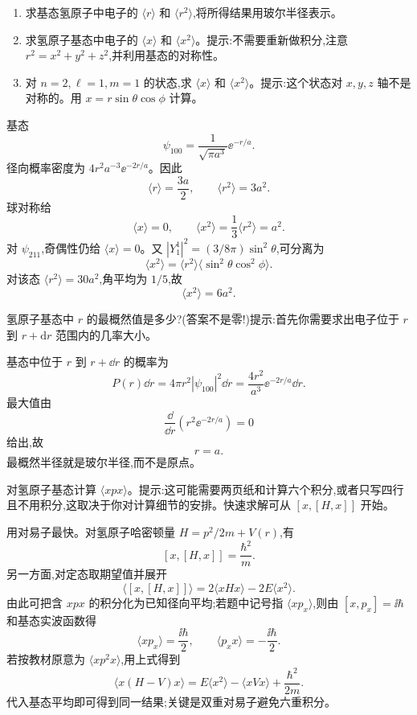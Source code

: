 \begin{question}
\begin{enumerate}
\item 求基态氢原子中电子的 $\langle r\rangle$ 和 $\langle r^2\rangle$,将所得结果用玻尔半径表示。
\item 求氢原子基态中电子的 $\langle x\rangle$ 和 $\langle x^2\rangle$。提示:不需要重新做积分,注意 $r^2=x^2+y^2+z^2$,并利用基态的对称性。
\item 对 $n=2,\ell=1,m=1$ 的状态,求 $\langle x\rangle$ 和 $\langle x^2\rangle$。提示:这个状态对 $x,y,z$ 轴不是对称的。用 $x=r\sin\theta\cos\phi$ 计算。
\end{enumerate}
\begin{solution}

基态
\[
\psi_{100}=\frac{1}{\sqrt{\pi a^3}}\ee^{-r/a}.
\]
径向概率密度为 $4r^2a^{-3}\ee^{-2r/a}$。因此
\[
\langle r\rangle=\frac{3a}{2},\qquad \langle r^2\rangle=3a^2.
\]
球对称给
\[
\langle x\rangle=0,
\qquad \langle x^2\rangle=\frac13\langle r^2\rangle=a^2.
\]
对 $\psi_{211}$,奇偶性仍给 $\langle x\rangle=0$。又 $|Y_1^1|^2=(3/8\pi)\sin^2\theta$,可分离为
\[
\langle x^2\rangle=\langle r^2\rangle\langle \sin^2\theta\cos^2\phi\rangle.
\]
对该态 $\langle r^2\rangle=30a^2$,角平均为 $1/5$,故
\[
\langle x^2\rangle=6a^2.
\]

\end{solution}
\end{question}

\begin{question}
氢原子基态中 $r$ 的最概然值是多少?(答案不是零!)提示:首先你需要求出电子位于 $r$ 到 $r+\mathrm dr$ 范围内的几率大小。
\begin{solution}

基态中位于 $r$ 到 $r+\dd r$ 的概率为
\[
P(r)\dd r=4\pi r^2|\psi_{100}|^2\dd r=\frac{4r^2}{a^3}\ee^{-2r/a}\dd r.
\]
最大值由
\[
\frac{\dd}{\dd r}\left(r^2\ee^{-2r/a}\right)=0
\]
给出,故
\[
r=a.
\]
最概然半径就是玻尔半径,而不是原点。

\end{solution}
\end{question}

\begin{question}
对氢原子基态计算 $\langle xpx\rangle$。提示:这可能需要两页纸和计算六个积分,或者只写四行且不用积分,这取决于你对计算细节的安排。快速求解可从 $[x,[H,x]]$ 开始。
\begin{solution}

用对易子最快。对氢原子哈密顿量 $H=p^2/2m+V(r)$,有
\[
[x,[H,x]]=\frac{\hbar^2}{m}.
\]
另一方面,对定态取期望值并展开
\[
\langle[x,[H,x]]\rangle=2\langle xHx\rangle-2E\langle x^2\rangle.
\]
由此可把含 $xpx$ 的积分化为已知径向平均;若题中记号指 $\langle xp_x\rangle$,则由 $[x,p_x]=\ii\hbar$ 和基态实波函数得
\[
\langle xp_x\rangle=\frac{\ii\hbar}{2},
\qquad
\langle p_xx\rangle=-\frac{\ii\hbar}{2}.
\]
若按教材原意为 $\langle x p^2 x\rangle$,用上式得到
\[
\langle x(H-V)x\rangle=E\langle x^2\rangle-\langle xVx\rangle+\frac{\hbar^2}{2m}.
\]
代入基态平均即可得到同一结果;关键是双重对易子避免六重积分。

\end{solution}
\end{question}

